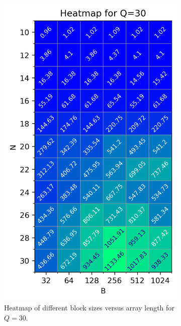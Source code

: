\documentclass[twocolumn]{article}
\begin{document}
\begin{figure}[h]
    \centering
    \begin{subfigure}{0.31\linewidth}
        \includegraphics[width=\linewidth]{report/plots/heatmap_BvN_Q=30.png}
        \caption{Heatmap of different block sizes versus array length for $Q=30$.}
        \label{fig:heatmap-q}
    \end{subfigure}
    \begin{subfigure}{0.31\linewidth}

\end{subfigure}
\end{figure}
\end{document}
